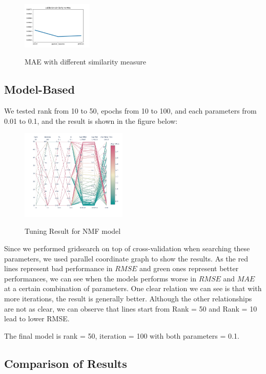 \documentclass[12pt,journal,compsoc]{IEEEtran}
\begin{document}
\begin{figure}[H]
\centering
\caption{MAE with different similarity measure}
\includegraphics[width=0.30\textwidth]{img/validation-similarity_vs_MAE.jpg}
\label{fig_sim}
\end{figure}


\subsection{Model-Based}
We tested rank from 10 to 50, epochs from 10 to 100, and each parameters from 0.01 to 0.1, and the result is shown in the figure below:
\begin{figure}[H]
\centering
\caption{Tuning Result for NMF model}
\includegraphics[width=0.45\textwidth]{img/NMF_hypter.png}
\label{fig_sim}
\end{figure}
Since we performed gridsearch on top of cross-validation when searching these parameters, we used parallel coordinate graph to show the results. As the red lines represent bad performance in $RMSE$ and green ones represent better performances, we can see when the models performs worse in $RMSE$ and $MAE$ at a certain combination of parameters. One clear relation we can see is that with more iterations, the result is generally better. Although the other relationships are not as clear, we can observe that lines start from Rank = 50 and Rank = 10 lead to lower RMSE. 

The final model is rank = 50, iteration = 100 with both parameters = 0.1. 


\subsection{Comparison of Results}
\end{document}
